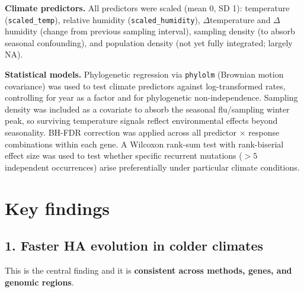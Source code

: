 \documentclass[11pt, a4paper]{article}
\begin{document}
\textbf{Climate predictors.}
All predictors were scaled (mean 0, SD 1):
temperature (\texttt{scaled\_temp}),
relative humidity (\texttt{scaled\_humidity}),
$\Delta$temperature and $\Delta$humidity (change from previous sampling
interval), sampling density (to absorb seasonal confounding), and population
density (not yet fully integrated; largely NA).

\textbf{Statistical models.}
Phylogenetic regression via \texttt{phylolm} (Brownian motion covariance) was
used to test climate predictors against log-transformed rates, controlling for
year as a factor and for phylogenetic non-independence.
Sampling density was included as a covariate to absorb the seasonal
flu/sampling winter peak, so surviving temperature signals reflect
environmental effects beyond seasonality.
BH-FDR correction was applied across all predictor $\times$ response
combinations within each gene.
A Wilcoxon rank-sum test with rank-biserial effect size was used to test
whether specific recurrent mutations (${>}5$ independent occurrences) arise
preferentially under particular climate conditions.

\section*{Key findings}

\subsection*{1. Faster HA evolution in colder climates}

This is the central finding and it is \textbf{consistent across methods,
genes, and genomic regions}.
\end{document}
